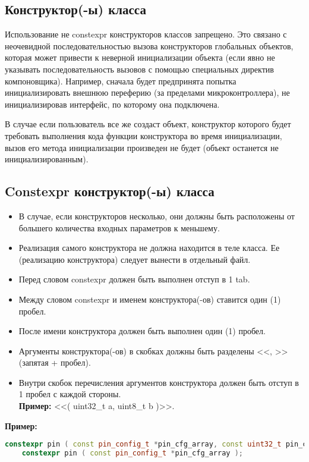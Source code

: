 \subsection{Конструктор(-ы) класса}\label{K:0:0}
Использование не constexpr конструкторов классов запрещено. Это связано с неочевидной последовательностью вызова конструкторов глобальных объектов, которая может привести к неверной инициализации объекта (если явно не указывать последовательность вызовов с помощью специальных директив компоновщика). Например, сначала будет предпринята попытка инициализировать внешнюю переферию (за пределами микроконтроллера), не инициализировав интерфейс, по которому она подключена.

В случае если пользователь все же создаст объект, конструктор которого будет требовать выполнения кода функции конструктора во время инициализации, вызов его метода инициализации произведен не будет (объект останется не инициализированным).

\subsection{Constexpr конструктор(-ы) класса}\label{K:0:1}
\begin{itemize}
	\item В случае, если конструкторов несколько, они должны быть расположены от большего количества входных параметров к меньшему.
	\item Реализация самого конструктора не должна находится в теле класса. Ее (реализацию конструктора) следует вынести в отдельный файл.
	\item Перед словом constexpr должен быть выполнен отступ в 1 tab.	
	\item Между словом constexpr и именем конструктора(-ов) ставится один (1) пробел.
	\item После имени конструктора должен быть выполнен один (1) пробел. 
	\item Аргументы конструктора(-ов) в скобках должны быть разделены <<, >> (запятая + пробел).
	\item Внутри скобок перечисления аргументов конструктора должен быть отступ в 1 пробел с каждой стороны.\\\textbf{Пример: } <<( uint32\_t a, uint8\_t b )>>.
\end{itemize}
\textbf{Пример:}\begin{lstlisting}[language=C++, frame=tlBR, basicstyle=\fontsize{10}{10}\ttfamily]
	constexpr pin ( const pin_config_t *pin_cfg_array, const uint32_t pin_cout );
	constexpr pin ( const pin_config_t *pin_cfg_array );
\end{lstlisting}

